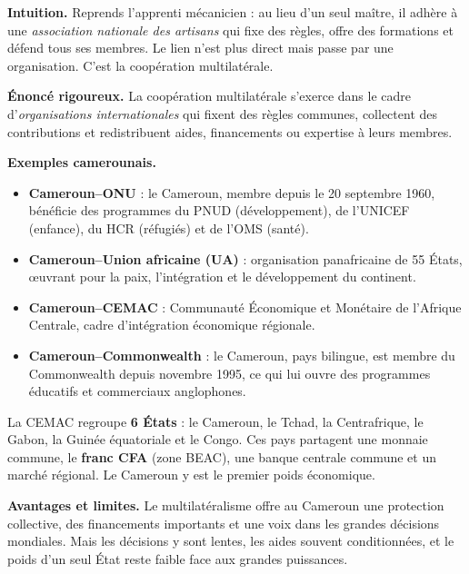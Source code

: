 \documentclass[11pt]{article}
\newcommand{\cle}[1]{{\popxbold\color{popdark}#1}}
\newcounter{popsec}
\newcounter{popsub}
\newcommand{\courssub}[1]{%
  \stepcounter{popsub}%
  \par\vspace{9pt}\noindent{\popxbold\fontsize{11.5}{13}\selectfont\color{popink}{\color{poporange}\thepopsec.\thepopsub}\hspace{6pt}#1}\par\nopagebreak\vspace{4pt}
}
\begin{document}
\courssub{La coopération multilatérale}

\textbf{Intuition.} Reprends l'apprenti mécanicien : au lieu d'un seul maître, il adhère à une \emph{association nationale des artisans} qui fixe des règles, offre des formations et défend tous ses membres. Le lien n'est plus direct mais passe par une organisation. C'est la coopération multilatérale.

\textbf{Énoncé rigoureux.} La coopération multilatérale s'exerce dans le cadre d'\emph{organisations internationales} qui fixent des règles communes, collectent des contributions et redistribuent aides, financements ou expertise à leurs membres.

\textbf{Exemples camerounais.}

\begin{itemize}
\item \textbf{Cameroun--ONU} : le Cameroun, membre depuis le 20 septembre 1960, bénéficie des programmes du PNUD (développement), de l'UNICEF (enfance), du HCR (réfugiés) et de l'OMS (santé).
\item \textbf{Cameroun--Union africaine (UA)} : organisation panafricaine de 55 États, œuvrant pour la paix, l'intégration et le développement du continent.
\item \textbf{Cameroun--CEMAC} : Communauté Économique et Monétaire de l'Afrique Centrale, cadre d'intégration économique régionale.
\item \textbf{Cameroun--Commonwealth} : le Cameroun, pays bilingue, est membre du Commonwealth depuis novembre 1995, ce qui lui ouvre des programmes éducatifs et commerciaux anglophones.
\end{itemize}

\begin{exemplebox}
La \cle{CEMAC} regroupe \textbf{6 États} : le Cameroun, le Tchad, la Centrafrique, le Gabon, la Guinée équatoriale et le Congo. Ces pays partagent une monnaie commune, le \textbf{franc CFA} (zone BEAC), une banque centrale commune et un marché régional. Le Cameroun y est le premier poids économique.
\end{exemplebox}

\textbf{Avantages et limites.} Le multilatéralisme offre au Cameroun une protection collective, des financements importants et une voix dans les grandes décisions mondiales. Mais les décisions y sont lentes, les aides souvent conditionnées, et le poids d'un seul État reste faible face aux grandes puissances.
\end{document}
